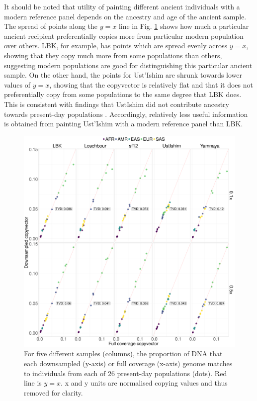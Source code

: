 It should be noted that utility of painting different ancient individuals with a modern reference panel depends on the ancestry and age of the ancient sample. The spread of points along the $y=x$ line in Fig. \ref{fig:CP_correlation_allSamples_0.1x_0.5x_30x_moderns} shows how much a particular ancient recipient preferentially copies more from particular modern population over others. LBK, for example, has points which are spread evenly across $y=x$, showing that they copy much more from some populations than others, suggesting modern populations are good for distinguishing this particular ancient sample. On the other hand, the points for Ust'Ishim are shrunk towards lower values of $y=x$, showing that the copyvector is relatively flat and that it does not preferentially copy from some populations to the same degree that LBK does. This is consistent with findings that UstIshim did not contribute ancestry towards present-day populations \cite{Fu2014}. Accordingly, relatively less useful information is obtained from painting Ust'Ishim with a modern reference panel than LBK.

\begin{figure}[htp]
    \centering
    \includegraphics[width=1.0\textwidth]{../images/chapter1/CP_correlation_allSamples_0.1x_0.5x_30x_moderns.pdf}
    \caption{For five different samples (columns), the proportion of DNA that each downsampled (y-axis) or full coverage (x-axis) genome matches to individuals from each of 26 present-day populations (dots). Red line is $y=x$. x and y units are normalised copying values and thus removed for clarity.}
    \label{fig:CP_correlation_allSamples_0.1x_0.5x_30x_moderns}
\end{figure}

